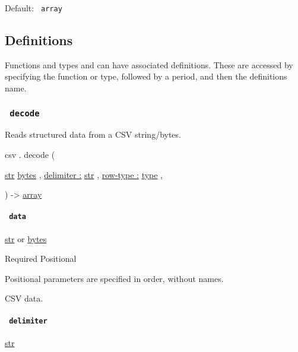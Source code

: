 Default: \texttt{\ array\ }

\subsection{\texorpdfstring{{ Definitions
}}{ Definitions }}\label{definitions}

\label{definitions-tooltip}
Functions and types and can have associated definitions. These are
accessed by specifying the function or type, followed by a period, and
then the definition\textquotesingle s name.

\subsubsection{\texorpdfstring{\texttt{\ decode\ }}{ decode }}\label{definitions-decode}

Reads structured data from a CSV string/bytes.

csv { . } { decode } (

{ \href{/docs/reference/foundations/str/}{str}
\href{/docs/reference/foundations/bytes/}{bytes} , } {
\hyperref[definitions-decode-parameters-delimiter]{delimiter :}
\href{/docs/reference/foundations/str/}{str} , } {
\hyperref[definitions-decode-parameters-row-type]{row-type :}
\href{/docs/reference/foundations/type/}{type} , }

) -\textgreater{} \href{/docs/reference/foundations/array/}{array}

\paragraph{\texorpdfstring{\texttt{\ data\ }}{ data }}\label{definitions-decode-data}

\href{/docs/reference/foundations/str/}{str} {or}
\href{/docs/reference/foundations/bytes/}{bytes}

{Required} {{ Positional }}

\label{definitions-decode-data-positional-tooltip}
Positional parameters are specified in order, without names.

CSV data.

\paragraph{\texorpdfstring{\texttt{\ delimiter\ }}{ delimiter }}\label{definitions-decode-delimiter}

\href{/docs/reference/foundations/str/}{str}

